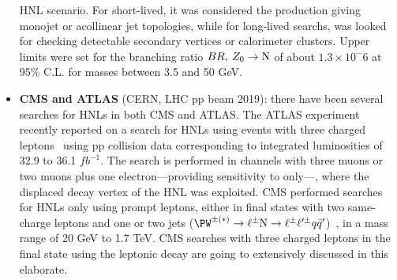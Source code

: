 \begin{itemize}
  HNL scenario. For short-lived, it was considered the \hnl production
  giving monojet or acollinear jet topologies, while for long-lived
  searchs, \hnl was looked for checking detectable secondary vertices or calorimeter clusters. 
 Upper limits were set for the branching ratio $BR, \: Z_0\rightarrow \mathrm{N}$ of
 about $1.3 \times 10^-6$ at 95\% C.L. for \hnl masses between 3.5 and
 50 GeV. 
\item \textbf{CMS and ATLAS} (CERN, LHC pp beam 2019): there have been several searches for HNLs in both CMS and ATLAS.
The ATLAS experiment recently reported on a search for HNLs using events with three charged leptons~\cite{atlasintro2} using 
pp collision data corresponding to integrated luminosities of 32.9 to
36.1 $fb^{-1}$. 
The search is performed in channels with three muons or two muons plus
one electron---providing sensitivity  to \mixparm only---, where the 
displaced decay vertex of the HNL was exploited.
CMS performed searches for HNLs only using prompt leptons,
either in final states with two same-charge leptons and one or two jets
(\(\PW^{\pm(\ast)}\to\ell^{\pm}\hnl\to\ell^{\pm}\ell^{\prime\pm}q\bar{q}^{\prime}\))~\cite{Sirunyan:2018xiv},
in a mass range of 20 GeV to 1.7 TeV.
CMS searches with three charged leptons in the final state using the leptonic \PW decay are going to extensively discussed in this
elaborate.
\end{itemize}

